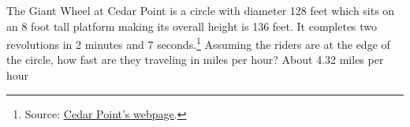 {The Giant Wheel at Cedar Point is a circle with diameter 128 feet which sits on an 8 foot tall platform making its overall height is 136 feet.    It completes two revolutions in 2 minutes and 7 seconds.\footnote{Source: \href{http://www.cedarpoint.com/public/park/rides/tranquil/giant_wheel.cfm}{\underline{Cedar Point's webpage}}.}  Assuming the riders are at the edge of the circle, how fast are they traveling in miles per hour?
\label{giantwheelmotion}}
{About 4.32 miles per hour}